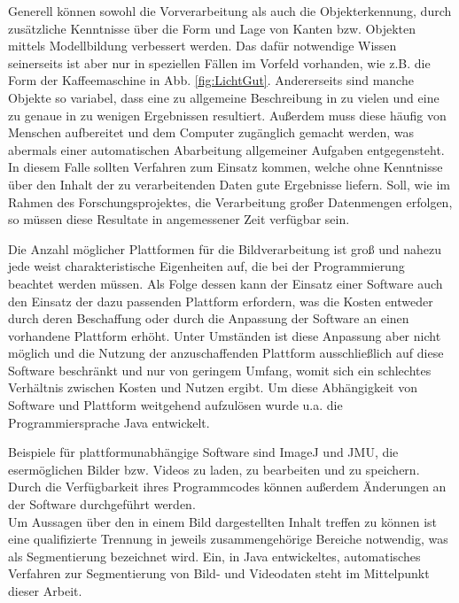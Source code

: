 \noindent Generell können sowohl die Vorverarbeitung als auch die Objekterkennung, durch zusätzliche Kenntnisse über die Form und Lage von Kanten bzw. Objekten mittels Modellbildung verbessert werden. Das dafür notwendige Wissen seinerseits ist aber nur in speziellen Fällen im Vorfeld vorhanden, wie z.B. die Form der Kaffeemaschine in Abb. \ref{fig:LichtGut}. Andererseits sind manche Objekte so variabel, dass eine zu allgemeine Beschreibung in zu vielen und eine zu genaue in zu wenigen Ergebnissen resultiert. Außerdem muss diese häufig von Menschen aufbereitet und dem Computer zugänglich gemacht werden, was abermals einer automatischen Abarbeitung allgemeiner Auf\-gaben entgegensteht.
In diesem Falle sollten Verfahren zum Einsatz kommen, welche ohne Kenntnisse über den Inhalt der zu verarbeitenden Daten gute Ergebnisse liefern.
Soll, wie im Rahmen des Forschungsprojektes, die Verarbeitung großer Datenmengen erfolgen, so müssen diese Resultate in angemessener Zeit verfügbar sein.\pagebreak

\noindent Die Anzahl möglicher Plattformen für die Bildverarbeitung ist groß und nahezu jede weist charakteristische Eigenheiten auf, die bei der Programmierung beachtet werden müssen. Als Folge dessen kann der Einsatz einer Software auch den Einsatz der dazu passenden Plattform erfordern, was die Kosten entweder durch deren Beschaffung oder durch die Anpassung der Software an einen vorhandene Plattform erhöht. Unter Umständen ist diese Anpassung aber nicht möglich und die Nutzung der anzuschaffenden Plattform ausschließlich auf diese Software beschränkt und nur von geringem Umfang, womit sich ein schlechtes Verhältnis zwischen Kosten und Nutzen ergibt. Um diese Abhängigkeit von Software und Plattform weitgehend aufzulösen wurde u.a. die Programmiersprache Java entwickelt. \cite{Wilhelm2005}

Beispiele für plattformunabhängige Software sind ImageJ und JMU, die es\linebreak ermöglichen Bilder bzw. Videos zu laden, zu bearbeiten und zu speichern.
Durch die Verfügbarkeit ihres Programmcodes können außerdem Änderungen an der Software durchgeführt werden.\\

\noindent Um Aussagen über den in einem Bild dargestellten Inhalt treffen zu können ist  eine qualifizierte Trennung in jeweils zusammengehörige Bereiche notwendig, was als Segmentierung bezeichnet wird.
Ein, in Java entwickeltes, automatisches Verfahren zur Segmentierung von Bild- und Videodaten steht im Mittelpunkt dieser Arbeit.


